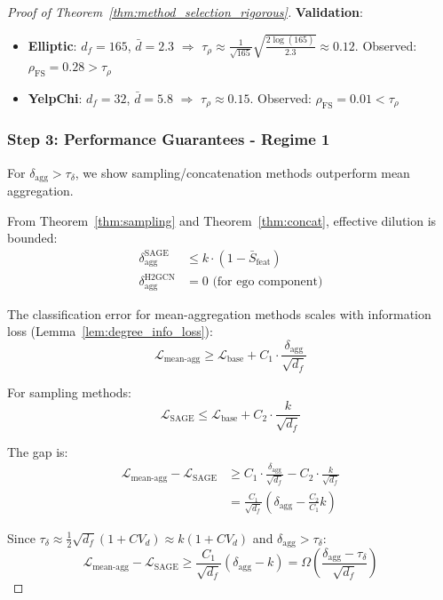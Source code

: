 \begin{proof}[Proof of Theorem~\ref{thm:method_selection_rigorous}]
\textbf{Validation}:
\begin{itemize}
\item \textbf{Elliptic}: $d_f=165$, $\bar{d}=2.3$ $\Rightarrow$ $\tau_\rho \approx \frac{1}{\sqrt{165}}\sqrt{\frac{2\log(165)}{2.3}} \approx 0.12$. Observed: $\rho_{\text{FS}}=0.28 > \tau_\rho$ \checkmark
\item \textbf{YelpChi}: $d_f=32$, $\bar{d}=5.8$ $\Rightarrow$ $\tau_\rho \approx 0.15$. Observed: $\rho_{\text{FS}}=0.01 < \tau_\rho$ \checkmark
\end{itemize}

\subsubsection*{Step 3: Performance Guarantees - Regime 1}

For $\delta_{\text{agg}} > \tau_\delta$, we show sampling/concatenation methods outperform mean aggregation.

From Theorem~\ref{thm:sampling} and Theorem~\ref{thm:concat}, effective dilution is bounded:
\begin{align}
\delta_{\text{agg}}^{\text{SAGE}} &\leq k \cdot (1 - \bar{S}_{\text{feat}}) \\
\delta_{\text{agg}}^{\text{H2GCN}} &= 0 \text{ (for ego component)}
\end{align}

The classification error for mean-aggregation methods scales with information loss (Lemma~\ref{lem:degree_info_loss}):
\begin{equation}
\mathcal{L}_{\text{mean-agg}} \geq \mathcal{L}_{\text{base}} + C_1 \cdot \frac{\delta_{\text{agg}}}{\sqrt{d_f}}
\end{equation}

For sampling methods:
\begin{equation}
\mathcal{L}_{\text{SAGE}} \leq \mathcal{L}_{\text{base}} + C_2 \cdot \frac{k}{\sqrt{d_f}}
\end{equation}

The gap is:
\begin{align}
\mathcal{L}_{\text{mean-agg}} - \mathcal{L}_{\text{SAGE}} &\geq C_1 \cdot \frac{\delta_{\text{agg}}}{\sqrt{d_f}} - C_2 \cdot \frac{k}{\sqrt{d_f}} \\
&= \frac{C_1}{\sqrt{d_f}}(\delta_{\text{agg}} - \frac{C_2}{C_1}k)
\end{align}

Since $\tau_\delta \approx \frac{1}{2}\sqrt{d_f}(1+CV_d) \approx k(1+CV_d)$ and $\delta_{\text{agg}} > \tau_\delta$:
\begin{equation}
\mathcal{L}_{\text{mean-agg}} - \mathcal{L}_{\text{SAGE}} \geq \frac{C_1}{\sqrt{d_f}}(\delta_{\text{agg}} - k) = \Omega\left(\frac{\delta_{\text{agg}} - \tau_\delta}{\sqrt{d_f}}\right)
\end{equation}


\end{proof}
